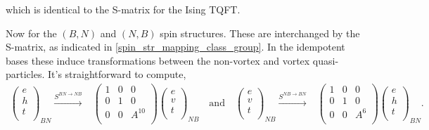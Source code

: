\documentclass[12pt,a4paper]{article}
\newcounter{arrow}
\begin{document}
which is identical to the S-matrix for the Ising TQFT. 

Now for the $(B,N)$ and $(N,B)$ spin structures.
These are interchanged by the S-matrix, as indicated in \ref{spin_str_mapping_class_group}.
In the idempotent bases these induce transformations between the non-vortex and vortex quasi-particles.
It's straightforward to compute,
\begin{align}
\left( \begin{matrix}
e\\
h\\
t\\
\end{matrix} \right)_{BN} 
\xrightarrow{S^{BN \rightarrow NB}} & \left( \begin{matrix}
1&0&0\\
0&1&0\\
0&0&A^{10}\\
\end{matrix} \right)
\left( \begin{matrix}
e\\
v\\
t\\
\end{matrix} \right)_{NB}
\quad \text{and} \quad 
\left( \begin{matrix}
e\\
v\\
t\\
\end{matrix} \right)_{NB} 
\xrightarrow{S^{NB \rightarrow BN}} & \left( \begin{matrix}
1&0&0\\
0&1&0\\
0&0&A^{6}\\
\end{matrix} \right)
\left( \begin{matrix}
e\\
h\\
t\\
\end{matrix} \right)_{BN}.
\end{align}
\end{document}
